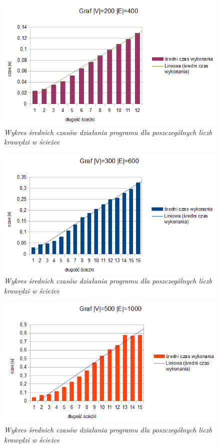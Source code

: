 \documentclass[a4paper, 12pt]{article}
\begin{document}
\begin{figure}[!htb]
\centering
\includegraphics[scale=0.8]{tests/3/wykres.PNG}
\caption{\em Wykres średnich czasów działania programu dla poszczególnych liczb krawędzi w ścieżce}
\label{fig:wykres200V}
\end{figure}

\begin{figure}[!htb]
\centering
\includegraphics[scale=0.8]{tests/1/wykres.PNG}
\caption{\em Wykres średnich czasów działania programu dla poszczególnych liczb krawędzi w ścieżce}
\label{fig:wykres300V}
\end{figure}

\begin{figure}[!htb]
\centering
\includegraphics[scale=0.8]{tests/2/wykres.PNG}
\caption{\em Wykres średnich czasów działania programu dla poszczególnych liczb krawędzi w ścieżce}
\label{fig:wykres500V}
\end{figure}
\end{document}

